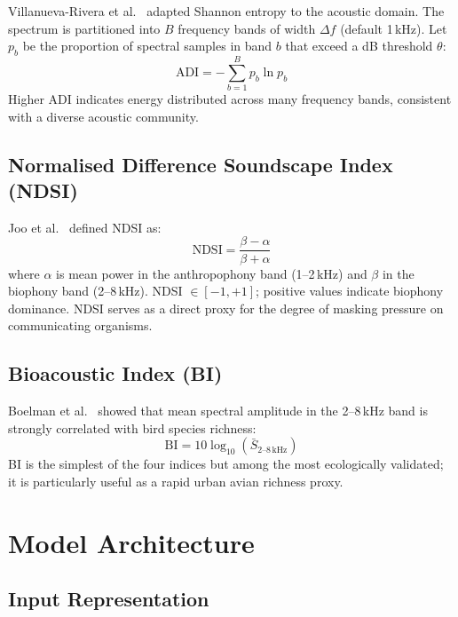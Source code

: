\documentclass[10pt,twocolumn]{article}
\begin{document}
Villanueva-Rivera et al.\ \cite{villanueva2011} adapted Shannon entropy to the
acoustic domain. The spectrum is partitioned into $B$ frequency bands of width
$\Delta f$ (default 1\,kHz). Let $p_b$ be the proportion of spectral samples
in band $b$ that exceed a dB threshold $\theta$:
\begin{equation}
  \mathrm{ADI} = -\sum_{b=1}^{B} p_b \ln p_b
  \label{eq:adi}
\end{equation}
Higher ADI indicates energy distributed across many frequency bands, consistent
with a diverse acoustic community.

\subsection{Normalised Difference Soundscape Index (NDSI)}

Joo et al.\ \cite{joo2011} defined NDSI as:
\begin{equation}
  \mathrm{NDSI} = \frac{\beta - \alpha}{\beta + \alpha}
  \label{eq:ndsi}
\end{equation}
where $\alpha$ is mean power in the anthropophony band (1–2\,kHz) and $\beta$
in the biophony band (2–8\,kHz). NDSI $\in [-1,+1]$; positive values indicate
biophony dominance. NDSI serves as a direct proxy for the degree of masking
pressure on communicating organisms.

\subsection{Bioacoustic Index (BI)}

Boelman et al.\ \cite{boelman2007} showed that mean spectral amplitude in the
2–8\,kHz band is strongly correlated with bird species richness:
\begin{equation}
  \mathrm{BI} = 10 \log_{10}\!\left(\bar{S}_{2\text{–}8\,\mathrm{kHz}}\right)
  \label{eq:bi}
\end{equation}
BI is the simplest of the four indices but among the most ecologically
validated; it is particularly useful as a rapid urban avian richness proxy.

\section{Model Architecture}
\label{sec:model}

\subsection{Input Representation}
\end{document}
